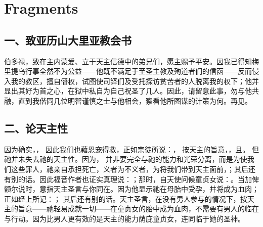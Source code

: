 
\chapter{Fragments}



\section{一、致亚历山大里亚教会书}

伯多禄，致在主内蒙爱、立于天主信德中的弟兄们，愿主赐予平安。\newline{}因我已得知梅里提乌行事全然不为公益——他既不满足于至圣主教及殉道者们的信函——反而侵入我的教区，擅自僭权，试图使司铎们及受托探访贫苦者的人脱离我的权下；他并显出其好为首之心，在狱中私自为自己祝圣了几人。\newline{}因此，请留意此事，勿与他共融，直到我偕同几位明智谨慎之士与他相会，察看他所图谋的计策为何。\newline{}再见。\par


\section{二、论天主性}

因为确实，， 因此我们也藉恩宠得救，正如宗徒所说：， 按天主的旨意，，且。 但祂并未失去祂的天主性。因为， 并非要完全与祂的能力和光荣分离，而是为使我们这些罪人，祂亲自承担死亡，义者为不义者，为将我们带到天主面前，；其后还有别的话。因此福音作者也证实真理说：；那时，自天使问候童贞女说：。当加俾额尔说时，意指天主圣言与你同在。因为他显示祂在母胎中受孕，并将成为血肉；正如经上所记：； 其后还有别的话。天主圣言，在没有男人参与的情况下，按天主的旨意——祂轻易成就一切——在童贞女的胎中成为血肉，不需要有男人的临在与行动。因为比男人更有效的是天主的能力荫庇童贞女，连同临于她的圣神。\par


